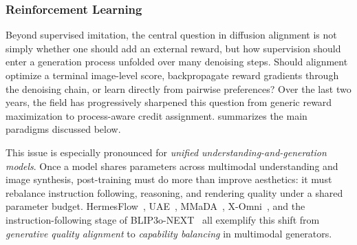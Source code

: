 \subsubsection{Reinforcement Learning}
\label{subsubsec:pref_alignment}

Beyond supervised imitation, the central question in diffusion alignment is not simply whether one should add an external reward, but how supervision should enter a generation process unfolded over many denoising steps. Should alignment optimize a terminal image-level score, backpropagate reward gradients through the denoising chain, or learn directly from pairwise preferences? Over the last two years, the field has progressively sharpened this question from generic reward maximization to process-aware credit assignment.  summarizes the main paradigms discussed below.

This issue is especially pronounced for \emph{unified understanding-and-generation models}. Once a model shares parameters across multimodal understanding and image synthesis, post-training must do more than improve aesthetics: it must rebalance instruction following, reasoning, and rendering quality under a shared parameter budget. HermesFlow~\citep{yang2025hermesflow}, UAE~\citep{yan2025uae}, MMaDA~\citep{yang2025mmada}, X-Omni~\citep{geng2025xomni}, and the instruction-following stage of BLIP3o-NEXT~\citep{chen2025blip3onext} all exemplify this shift from \emph{generative quality alignment} to \emph{capability balancing} in multimodal generators.

